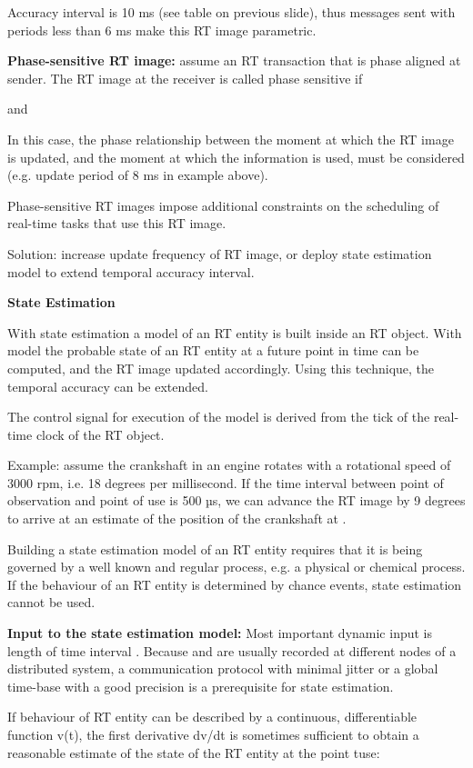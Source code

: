 Accuracy interval is 10 ms (see table on previous slide), thus messages
sent with periods less than 6 ms make this RT image parametric.

\textbf{Phase-sensitive RT image:} assume an RT transaction that is
phase aligned at sender. The RT image at the receiver is called phase
sensitive if

and

In this case, the phase relationship between the moment at which the RT
image is updated, and the moment at which the information is used, must
be considered (e.g. update period of 8 ms in example above).

Phase-sensitive RT images impose additional constraints on the
scheduling of real-time tasks that use this RT image.

Solution: increase update frequency of RT image, or deploy state
estimation model to extend temporal accuracy interval.

\textbf{State Estimation}

With state estimation a model of an RT entity is built inside an RT
object. With model the probable state of an RT entity at a future point
in time can be computed, and the RT image updated accordingly. Using
this technique, the temporal accuracy can be extended.

The control signal for execution of the model is derived from the tick
of the real-time clock of the RT object.

Example: assume the crankshaft in an engine rotates with a rotational
speed of 3000 rpm, i.e. 18 degrees per millisecond. If the time interval
between point of observation and point of use is 500 µs, we can advance
the RT image by 9 degrees to arrive at an estimate of the position of
the crankshaft at .

Building a state estimation model of an RT entity requires that it is
being governed by a well known and regular process, e.g. a physical or
chemical process. If the behaviour of an RT entity is determined by
chance events, state estimation cannot be used.

\textbf{Input to the state estimation model:} Most important dynamic
input is length of time interval . Because and are usually recorded at
different nodes of a distributed system, a communication protocol with
minimal jitter or a global time-base with a good precision is a
prerequisite for state estimation.

If behaviour of RT entity can be described by a continuous,
differentiable function v(t), the first derivative dv/dt is sometimes
sufficient to obtain a reasonable estimate of the state of the RT entity
at the point tuse:

